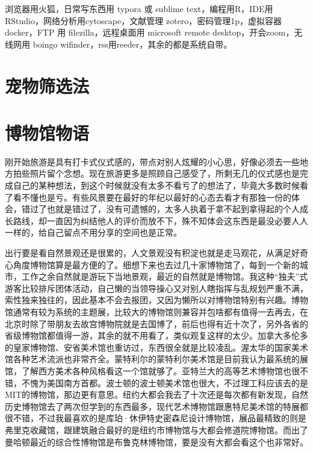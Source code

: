 \documentclass[
  letterpaper,
  DIV=11,
  numbers=noendperiod]{scrreprt}
\begin{document}
浏览器用火狐，日常写东西用 typora 或 sublime text，编程用R，IDE用
RStudio，网络分析用cytoscape，文献管理 zotero，密码管理1p，虚拟容器
docker，FTP 用 filezilla，远程桌面用 microsoft remote
desktop，开会zoom，无线网用 boingo
wifinder，rss用reeder，其余的都是系统自带。

\section{宠物筛选法}\label{ux5ba0ux7269ux7b5bux9009ux6cd5}

\section{博物馆物语}\label{ux535aux7269ux9986ux7269ux8bed}

刚开始旅游是具有打卡式仪式感的，带点对别人炫耀的小心思，好像必须去一些地方拍些照片留个念想。现在旅游更多是照顾自己感受了，所剩无几的仪式感也是完成自己的某种想法，到这个时候就没有太多不看亏了的想法了，毕竟大多数时候看了看不懂也是亏。有些风景要在最好的年纪以最好的心态去看才有那独一份的体会，错过了也就是错过了，没有可遗憾的，太多人执着于拿不起到拿得起的个人成长路线，却一直因为纠结他人的评价而放不下，殊不知体会这东西是最没必要人人一样的，给自己留点不用分享的空间也是正常。

出行要是看自然景观还是很累的，人文景观没有积淀也就是走马观花，从满足好奇心角度博物馆算是最方便的了。细想下来也去过几十家博物馆了，每到一个新的城市，工作之余自然就是游玩下当地景观，最近的自然就是博物馆。我这种``独夫''式游客比较排斥团体活动，自己懒的当领导操心又对别人瞎指挥与乱规划严重不满，索性独来独往的，因此基本不会去报团，又因为懒所以对博物馆特别有兴趣。博物馆通常有较为系统的主题展，比较大的博物馆则兼容并包啥都有值得一去再去，在北京时除了带朋友去故宫博物院就是去国博了，前后也得有近十次了，另外各省的省级博物馆都值得一游，其余的就不用看了，类似观复这样的太少。加拿大多伦多的皇家博物馆、安省美术馆也重访过，东西很全就是比较凌乱。渥太华的国家美术馆各种艺术流派也非常齐全。蒙特利尔的蒙特利尔美术馆是目前我认为最系统的展馆，了解西方美术各种风格看这一个馆就够了。亚特兰大的高等艺术博物馆也很不错，不愧为美国南方首都。波士顿的波士顿美术馆也很大，不过理工科应该去的是MIT的博物馆，那边更有意思。纽约大都会我去了十次还是每次都有新发现，自然历史博物馆去了两次但学到的东西最多，现代艺术博物馆跟惠特尼美术馆的特展都很不错，不过我最喜欢的是库珀·休伊特史密森尼设计博物馆，展品最精致的则是弗里克收藏馆，跟建筑融合最好的是纽约市博物馆与大都会修道院博物馆。而出了曼哈顿最近的综合性博物馆是布鲁克林博物馆，要是没有大都会看这个也非常好。
\end{document}
